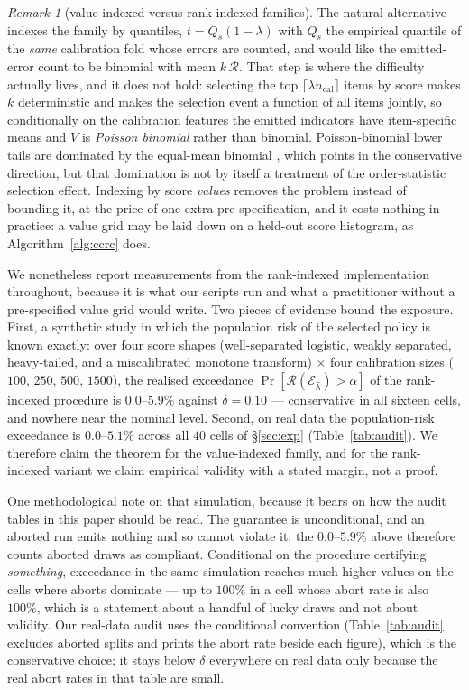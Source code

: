 \documentclass[review,number,doubleblind]{elsarticle}
\theoremstyle{plain}
\theoremstyle{definition}
\theoremstyle{remark}
\newtheorem{remark}{Remark}
\newcommand{\Risk}{\mathcal{R}}
\newcommand{\emit}{\mathcal{E}}
\begin{document}
\begin{remark}[value-indexed versus rank-indexed families]
\label{rem:rankvsvalue}
The natural alternative indexes the family by quantiles, $t=Q_s(1-\lambda)$ with
$Q_s$ the empirical quantile of the \emph{same} calibration fold whose errors are counted, and
would like the emitted-error count to be binomial with mean $k\,\Risk$. That step is where the
difficulty actually lives, and it does not hold: selecting the top
$\lceil\lambda n_{\mathrm{cal}}\rceil$ items by score makes $k$ deterministic and makes the
selection event a function of all items jointly, so conditionally on the calibration features
the emitted indicators have item-specific means and $V$ is \emph{Poisson binomial} rather than
binomial. Poisson-binomial lower tails are dominated by the equal-mean binomial
\citep{hoeffding1956}, which points in the conservative direction, but that domination is not
by itself a treatment of the order-statistic selection effect. Indexing by score \emph{values}
removes the problem instead of bounding it, at the price of one extra pre-specification, and
it costs nothing in practice: a value grid may be laid down on a held-out score histogram, as
Algorithm~\ref{alg:ccrc} does.

We nonetheless report measurements from the rank-indexed implementation throughout, because it
is what our scripts run and what a practitioner without a pre-specified value grid would write.
Two pieces of evidence bound the exposure. First, a synthetic study in which the population risk
of the selected policy is known exactly: over four score shapes (well-separated logistic, weakly
separated, heavy-tailed, and a miscalibrated monotone transform) $\times$ four calibration sizes
($100$, $250$, $500$, $1500$), the realised exceedance $\Pr[\Risk(\emit_{\hat\lambda})>\alpha]$
of the rank-indexed procedure is $0.0$--$5.9\%$ against $\delta=0.10$ --- conservative in all
sixteen cells, and nowhere near the nominal level. Second, on real data the population-risk
exceedance is $0.0$--$5.1\%$ across all $40$ cells of \S\ref{sec:exp}
(Table~\ref{tab:audit}). We therefore claim the theorem for the value-indexed family, and for
the rank-indexed variant we claim empirical validity with a stated margin, not a proof.

One methodological note on that simulation, because it bears on how the audit tables in this
paper should be read. The guarantee is unconditional, and an aborted run emits nothing and so
cannot violate it; the $0.0$--$5.9\%$ above therefore counts aborted draws as compliant.
Conditional on the procedure certifying \emph{something}, exceedance in the same simulation
reaches much higher values on the cells where aborts dominate --- up to $100\%$ in a cell whose
abort rate is also $100\%$, which is a statement about a handful of lucky draws and not about
validity. Our real-data audit uses the conditional convention (Table~\ref{tab:audit} excludes
aborted splits and prints the abort rate beside each figure), which is the conservative choice;
it stays below $\delta$ everywhere on real data only because the real abort rates in that table
are small.
\end{remark}
\end{document}
